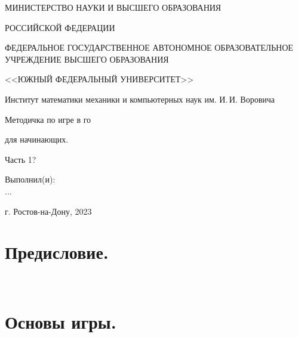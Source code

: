 \documentclass[14pt,a4paper]{extarticle}
\begin{document}
\thispagestyle{empty}
\begin{center}
\small{МИНИСТЕРСТВО НАУКИ И ВЫСШЕГО ОБРАЗОВАНИЯ}\par
\small{РОССИЙСКОЙ ФЕДЕРАЦИИ}\par
\small{ФЕДЕРАЛЬНОЕ ГОСУДАРСТВЕННОЕ АВТОНОМНОЕ ОБРАЗОВАТЕЛЬНОЕ УЧРЕЖДЕНИЕ ВЫСШЕГО ОБРАЗОВАНИЯ}\par
\small{<<ЮЖНЫЙ ФЕДЕРАЛЬНЫЙ УНИВЕРСИТЕТ>>}\par
\normalsize{Институт математики механики и компьютерных наук им. И.\,И. Воровича}\par
\end{center}


\vspace*{5.0em plus 0.2em minus 0.2em}

\begin{center}
Методичка по игре в го
\end{center}

\begin{center}
для начинающих.
\end{center}

\begin{center}
Часть 1?
\end{center}

\vspace*{5.0em plus 0.2em minus 0.2em}
\begin{flushright}
 Выполнил(и):\\
	...
\end{flushright}






\vspace*{\fill}

\begin{center}
г. Ростов-на-Дону, 2023
\end{center}

\newpage
\thispagestyle{empty}
\tableofcontents


\newpage

\section*{Предисловие.}
\

\newpage

\section*{Основы игры.}
\end{document}
